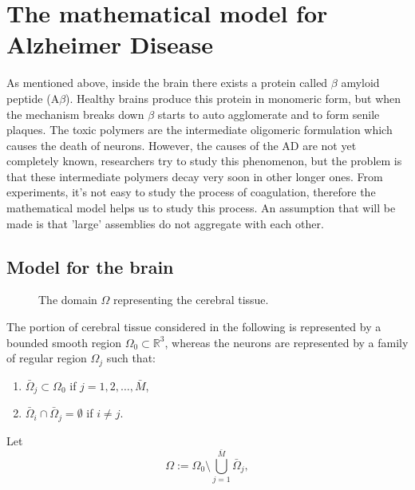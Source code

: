 \section{The mathematical model for Alzheimer Disease}
As mentioned above, inside the brain there exists a protein called \(\beta\) amyloid peptide ($\mathrm{A} \beta$). Healthy brains produce this protein in monomeric form, but when the mechanism breaks down \(\beta\) starts to auto agglomerate and to form senile plaques. The toxic polymers are the intermediate oligomeric formulation which causes the death of neurons. However, the causes of the AD are not yet completely known, researchers try to study this phenomenon, but the problem is that these intermediate polymers decay very soon in other longer ones. From experiments, it's not easy to study the process of coagulation, therefore the mathematical model helps us to study this process. An assumption that will be made is that 'large' assemblies do not aggregate with each other.
\subsection{Model for the brain}
\begin{figure}[H]
  \centering
  \caption{The domain $\Omega$ representing the cerebral tissue.}
  \label{fig:domain}
\end{figure}
The portion of cerebral tissue considered  in the following is represented by a bounded smooth region $\Omega_{0}\subset \mathbb{R}^3$, whereas the neurons are represented by a family of regular region $\Omega_{j}$ such that:
\begin{enumerate}[label=(\roman*)]
    \item $\bar\Omega_{j}\subset \Omega_{0}$  if   $j=1,2,\dots,\bar{M}$,
    \item $\bar\Omega_{i}\cap \bar\Omega_{j}= \emptyset$  if $i\neq j$.
\end{enumerate}
Let 
$$
\Omega := \Omega_{0} \setminus
\bigcup_{j=1}^{\bar M} \bar\Omega_{j},
$$

